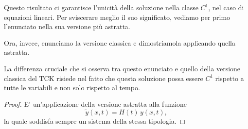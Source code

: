 Questo risultato ci garantisce l'unicità della soluzione nella classe $C^1$, nel caso di equazioni lineari. Per sviscerare meglio il suo significato, vediamo per primo l'enunciato nella sua versione più astratta.

\begin{theorem}
\end{theorem}

Ora, invece, enunciamo la versione classica e dimostriamola applicando quella astratta.

\begin{theorem}
\end{theorem}

\begin{remark}
La differenza cruciale che si osserva tra questo enunciato e quello della versione classica del TCK risiede nel fatto che questa soluzione possa essere $C^1$ rispetto a tutte le variabili e non solo rispetto al tempo.
\end{remark}

\begin{proof}
E' un'applicazione della versione astratta alla funzione $$\widetilde{y}(x,t) = H(t) \, y(x,t),$$ 
la quale soddisfa sempre un sistema della stessa tipologia.
\end{proof}

